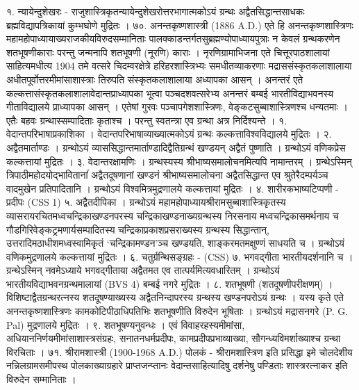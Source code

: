 १. न्यायेन्दुशेखरः -
राजुशास्त्रिकृतन्यायेन्दुशेखरोत्तरभागात्मकोऽयं ग्रन्थः अद्वैतसिद्धान्तसाधकः ब्रह्मविद्यापत्रिकायां कुम्भघोणे मुद्रितः ।
७०. अनन्तकृष्णशास्त्री (1886 A.D.)
एते हि अनन्तकृष्णशास्त्रिणः महामहोपाध्यायाख्यराजकीयविरुदसम्मानिताः पालक्काडन्तर्गतसुब्रह्मण्योपाध्यायपुत्राः न केवलं ग्रन्थकरणेन शतभूषणीकाराः परन्तु जन्मनापि शतभूषणी (नूरणि) काराः । नृरणिग्रामाभिजना एते चित्तूरपाठशालायां साहित्यमधीत्य 1904 तमे वत्सरे चिदम्वरक्षेत्रे हरिहरशास्त्रिभ्यः समधीतव्याकरणाः मद्राससंस्कृतकलाशालाया अधीतपूर्वोत्तरमीमांसाशास्त्राः तिरुपति संस्कृतकलाशालाया अध्यापका आसन् । अनन्तरं एते कल्कत्तासंस्कृतकलाशालावेदान्तप्राध्यापका भूत्वा पञ्चदशवत्सरेभ्य अनन्तरं बम्बई भारतीविद्याभवनस्य गीताविद्यालये प्राध्यापका आसन् । एतेषां गुरवः पञ्चापगेशशास्त्रिणः, वेङ्कटसुब्बाशास्त्रिणश्च धन्यतमाः । एतैः बहवः ग्रन्थास्सम्पादिताः कृताश्च । परन्तु स्वतन्त्रा एव ग्रन्था अत्र निर्दिश्यन्ते ।
१. वेदान्तपरिभाषाप्रकाशिका । वेदान्तपरिभाषाव्याख्यात्मकोऽयं ग्रन्थः कल्कत्ताविश्वविद्यालये मुद्रितः ।
२. अद्वैतमार्ताण्डः । ग्रन्थोऽयं व्याससिद्धान्तमार्ताण्डादिद्वैतिग्रन्थं खण्डयन् अद्वैतं पुष्णाति । ग्रन्थोऽयं वणिकप्रेस कल्कत्तायां मुद्रितः ।
३. वेदान्तरक्षामणिः । ग्रन्थस्यस्य श्रीभाष्यसमालोचनमित्यपि नामान्तरम् । ग्रन्थेऽस्मिन् त्रिपाठीमहोदयोद्भावितानांं अद्वैतदूषणानां खण्डनं श्रीभाष्यसमालोचना अद्वैतसिद्धान्त एव श्रुतेरैदम्पर्यञ्च वादमुखेन प्रतिपादितानि । ग्रन्थोऽयं विश्वमित्रमुद्रणालये कल्कत्तायां मुद्रितः ।
४. शारीरकभाष्यटिप्पणी - प्रदीपः (CSS 1)
५. अद्वैतदीपिका । ग्रन्थोऽयं महामहोपाध्यायश्रीरामसुब्बाशास्त्रिकृतस्य व्यासरायरचितमध्वचन्द्रिकाखण्डनपरस्य चन्द्रिकाखण्डनाख्यग्रन्थस्य निरसनाय मध्वचन्द्रिकासमर्थनाय च गौडगिरिवेङ्कट्रमणार्यसम्पादितस्य चन्द्रिकाप्रकाशप्रसराख्यस्य ग्रन्थस्य सिद्धान्तान्, उत्तरादिमठाधीशमध्वस्वामिकृतं `चन्द्रिकामण्डन'ञ्च खण्डयति, शाङ्करमतमक्षुण्णं साधयति च । ग्रन्थोऽयं वणिकमुद्रणालये कल्कत्तायां मुद्रितः ।
६. चतुर्ग्रन्थिसङ्ग्रहः - (CSS)
७. भगवद्गीता भारतीयदर्शनानि च । ग्रन्थेऽस्मिन् नवमेऽध्याये भगवद्गीताया अद्वैतमत एव तात्पर्यमित्यवधारितम् । ग्रन्थोऽयं भारतीयविद्याभवनग्रन्थमालायां (BVS 4) बम्बई नगरे मुद्रितः ।
८. शतभूषणी (शतदूषणीपरीक्षणम्) । विशिष्टाद्वैतग्रन्थरत्नस्य शतदूषण्याख्यस्य अद्वैतनिन्दापरस्य ग्रन्थस्य खण्डनपरोऽयं ग्रन्थः । यस्य कृते एते अनन्तकृष्णशास्त्रिणः कामकोटिपीठाधिपतिभिः शतभूषणीति विरुदेन भूषिताः । ग्रन्थोऽयं मद्रासनगरे (P. G. Pal) मुद्रणालये मुद्रितः ।
९. शतभूषण्यनुवन्धः । एवं विवाहरहस्यमीमांसा, अधियाननिर्णयमीमांसाशास्त्रसंग्रहः, सनातनधर्मप्रदीपः, कामप्रदीपप्रभाव्याख्या, सौगन्ध्यविमर्शाख्याश्च ग्रन्था विरचिताः ।
७१. श्रीरामशास्त्री (1900-1968 A.D.)
पोलकं - श्रीरामशास्त्रिण इति प्रसिद्धा इमे चोलदेशीय नन्निलग्रामसमीपस्थ पोलकाख्याग्रहारे प्राप्तजन्प्तानः वेदान्तसाहित्यादिषु दर्शनेषु पण्डिताः शास्त्ररत्नाकर इति विरुदेन सम्मानिताः ।
